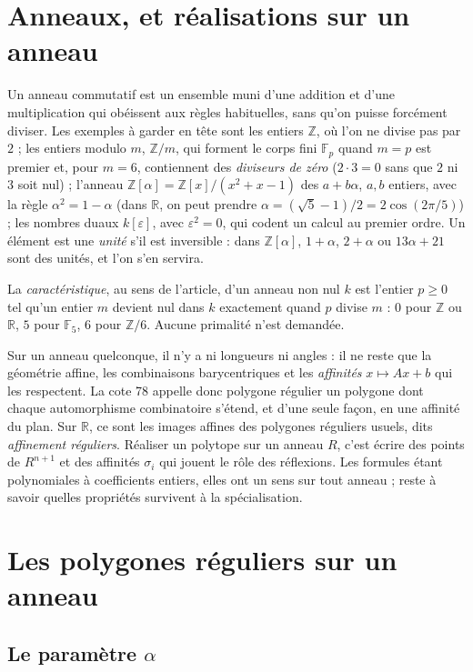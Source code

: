 \documentclass[11pt,a4paper]{amsart}
\theoremstyle{definition}
\theoremstyle{plain}
\theoremstyle{remark}
\newcommand{\Z}{\mathbb Z}
\newcommand{\F}{\mathbb F}
\newcommand{\R}{\mathbb R}
\begin{document}
\section{Anneaux, et réalisations sur un anneau}

Un anneau commutatif est un ensemble muni d'une addition et d'une multiplication qui obéissent aux règles habituelles, sans qu'on puisse forcément diviser. Les exemples à garder en tête sont les entiers $\Z$, où l'on ne divise pas par $2$ ; les entiers modulo $m$, $\Z/m$, qui forment le corps fini $\F_p$ quand $m = p$ est premier et, pour $m = 6$, contiennent des \emph{diviseurs de zéro} ($2 \cdot 3 = 0$ sans que $2$ ni $3$ soit nul) ; l'anneau $\Z[\alpha] = \Z[x]/(x^2 + x - 1)$ des $a + b\alpha$, $a, b$ entiers, avec la règle $\alpha^2 = 1 - \alpha$ (dans $\R$, on peut prendre $\alpha = (\sqrt5 - 1)/2 = 2\cos(2\pi/5)$) ; les nombres duaux $k[\varepsilon]$, avec $\varepsilon^2 = 0$, qui codent un calcul au premier ordre. Un élément est une \emph{unité} s'il est inversible : dans $\Z[\alpha]$, $1 + \alpha$, $2 + \alpha$ ou $13\alpha + 21$ sont des unités, et l'on s'en servira.

La \emph{caractéristique}, au sens de l'article, d'un anneau non nul $k$ est l'entier $p \ge 0$ tel qu'un entier $m$ devient nul dans $k$ exactement quand $p$ divise $m$ : $0$ pour $\Z$ ou $\R$, $5$ pour $\F_5$, $6$ pour $\Z/6$. Aucune primalité n'est demandée.

Sur un anneau quelconque, il n'y a ni longueurs ni angles : il ne reste que la géométrie affine, les combinaisons barycentriques et les \emph{affinités} $x \mapsto Ax + b$ qui les respectent. La cote 78 appelle donc polygone régulier un polygone dont chaque automorphisme combinatoire s'étend, et d'une seule façon, en une affinité du plan. Sur $\R$, ce sont les images affines des polygones réguliers usuels, dits \emph{affinement réguliers}. Réaliser un polytope sur un anneau $R$, c'est écrire des points de $R^{n+1}$ et des affinités $\sigma_i$ qui jouent le rôle des réflexions. Les formules étant polynomiales à coefficients entiers, elles ont un sens sur tout anneau ; reste à savoir quelles propriétés survivent à la spécialisation.

\section{Les polygones réguliers sur un anneau}

\subsection{Le paramètre \texorpdfstring{$\alpha$}{alpha}}
\end{document}
